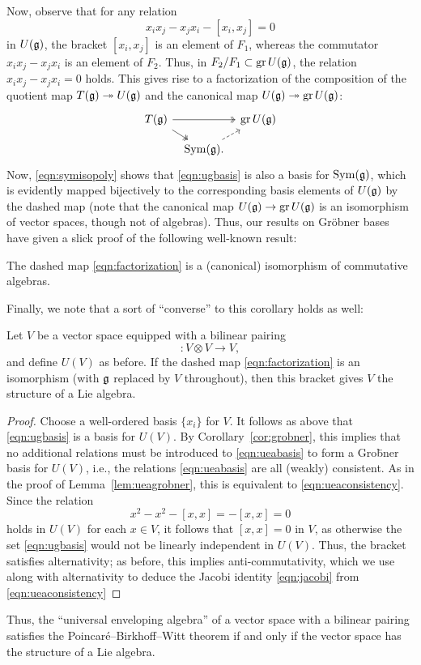 Now, observe that for any relation
\begin{equation*}
x_ix_j-x_jx_i-[x_i,x_j]=0
\end{equation*}
in $U(\mathfrak{g})$, the bracket $[x_i,x_j]$ is an element of $F_1$, whereas the commutator $x_ix_j-x_jx_i$ is an element of $F_2$. Thus, in $F_2/F_1\subset\operatorname{gr} U(\mathfrak{g})$, the relation $x_ix_j-x_jx_i=0$ holds. This gives rise to a factorization of the composition of the quotient map $T(\mathfrak{g})\twoheadrightarrow U(\mathfrak{g})$ and the canonical map $U(\mathfrak{g})\twoheadrightarrow\operatorname{gr} U(\mathfrak{g})$:
\begin{equation}
\label{eqn:factorization}
\begin{tikzcd}[column sep=tiny,row sep=small]
T(\g)\arrow[rr,two heads]\arrow[rd,two heads]&&\gr U(\g)\\
&\Sym(\g).\arrow[ru,dashed]&
\end{tikzcd}
\end{equation}
Now, \eqref{eqn:symisopoly} shows that \eqref{eqn:ugbasis} is also a basis for $\operatorname{Sym}(\mathfrak{g})$, which is evidently mapped bijectively to the corresponding basis elements of $U(\mathfrak{g})$ by the dashed map (note that the canonical map $U(\mathfrak{g})\to\operatorname{gr} U(\mathfrak{g})$ is an isomorphism of vector spaces, though not of algebras). Thus, our results on Gr\"obner bases have given a slick proof of the following well-known result:

\begin{cor}
The dashed map \eqref{eqn:factorization} is a (canonical) isomorphism of commutative algebras.
\end{cor}

Finally, we note that a sort of ``converse'' to this corollary holds as well:

\begin{prop}
Let $V$ be a vector space equipped with a bilinear pairing
\begin{equation*}
[-,-]\colon V\otimes V\to V,
\end{equation*}
and define $U(V)$ as before. If the dashed map \eqref{eqn:factorization} is an isomorphism (with $\mathfrak{g}$ replaced by $V$ throughout), then this bracket gives $V$ the structure of a Lie algebra.
\end{prop}
\begin{proof}
Choose a well-ordered basis $\{x_i\}$ for $V$. It follows as above that \eqref{eqn:ugbasis} is a basis for $U(V)$. By Corollary~\ref{cor:grobner}, this implies that no additional relations must be introduced to \eqref{eqn:ueabasis} to form a Gro\"bner basis for $U(V)$, i.e., the relations \eqref{eqn:ueabasis} are all (weakly) consistent. As in the proof of Lemma~\ref{lem:ueagrobner}, this is equivalent to \eqref{eqn:ueaconsistency}. Since the relation
\begin{equation*}
x^2-x^2-[x,x]=-[x,x]=0
\end{equation*}
holds in $U(V)$ for each $x\in V$, it follows that $[x,x]=0$ in $V$, as otherwise the set \eqref{eqn:ugbasis} would not be linearly independent in $U(V)$. Thus, the bracket satisfies alternativity; as before, this implies anti-commutativity, which we use along with alternativity to deduce the Jacobi identity \eqref{eqn:jacobi} from \eqref{eqn:ueaconsistency}
\end{proof}

Thus, the ``universal enveloping algebra'' of a vector space with a bilinear pairing satisfies the Poincar\'e--Birkhoff--Witt theorem if and only if the vector space has the structure of a Lie algebra.

